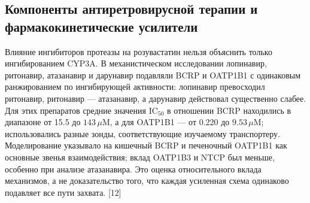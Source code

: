 \documentclass[11pt]{article}
\begin{document}
\subsection{Компоненты антиретровирусной терапии и фармакокинетические усилители}

Влияние ингибиторов протеазы на розувастатин нельзя объяснить только ингибированием CYP3A. В механистическом исследовании лопинавир, ритонавир, атазанавир и дарунавир подавляли BCRP и OATP1B1 с одинаковым ранжированием по ингибирующей активности: лопинавир превосходил ритонавир, ритонавир --- атазанавир, а дарунавир действовал существенно слабее. Для этих препаратов средние значения \(\mathrm{IC}_{50}\) в отношении BCRP находились в диапазоне от 15.5 до \(143\,\mu\mathrm{M}\), а для OATP1B1 --- от 0.220 до \(9.53\,\mu\mathrm{M}\); использовались разные зонды, соответствующие изучаемому транспортеру. Моделирование указывало на кишечный BCRP и печеночный OATP1B1 как основные звенья взаимодействия; вклад OATP1B3 и NTCP был меньше, особенно при анализе атазанавира. Это оценка относительного вклада механизмов, а не доказательство того, что каждая усиленная схема одинаково подавляет все пути захвата. [12]
\end{document}
